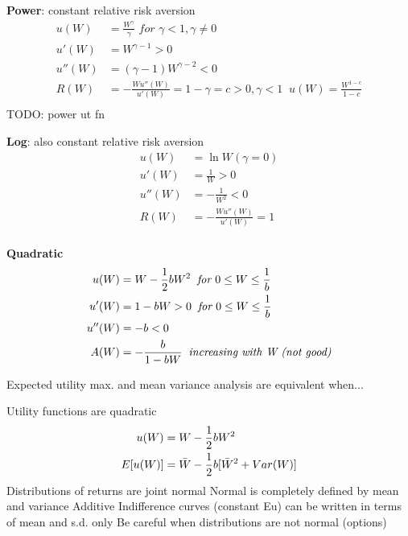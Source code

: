\documentclass[
14pt,notheorems,hyperref={pdfauthor=whatever}
]{beamer}
\begin{document}
\begin{frame}
\textbf{Power}: constant relative risk aversion\\
\begin{align*}
    u(W)&=\frac{W^\gamma}{\gamma} \textit{ for } \gamma<1, \gamma\neq0\\
    u'(W)&=W^{\gamma-1}>0\\
    u''(W)&=(\gamma-1)W^{\gamma-2}<0\\
    R(W)&=-\frac{Wu''(W)}{u'(W)} = 1-\gamma = c > 0, \gamma < 1 \;\; u(W)=\frac{W^{1-c}}{1-c}\\
\end{align*}
TODO: power ut fn
\end{frame}

\begin{frame}
\textbf{Log}: also constant relative risk aversion\\
\begin{align*}
    u(W)&=\ln{W} (\gamma=0)\\
    u'(W)&=\frac{1}{W}>0\\
    u''(W)&=-\frac{1}{W^2}<0\\
    R(W)&=-\frac{Wu''(W)}{u'(W)}=1\\
\end{align*}
\end{frame}

\begin{frame}
\textbf{Quadratic}\\
\begin{align*}
    u(W)&=W-\frac{1}{2}bW^2 \textit{\;\;for } 0\leq W\leq \frac{1}{b}\\
    u'(W)&=1-bW>0 \textit{\;\;for } 0\leq W\leq \frac{1}{b}\\
    u''(W)&=-b<0\\
    A(W)&=-\frac{b}{1-bW} \textit{\;\;increasing with W (not good)}\\
\end{align*}
\end{frame}

\begin{frame}
Expected utility max. and mean variance analysis are equivalent when...\\
\hfill \break
\begin{outline}
    \1 Utility functions are quadratic
    \begin{align*}
        u(W)&=W-\frac{1}{2}bW^2\\
        E[u(W)]&=\Bar{W}-\frac{1}{2}b[\Bar{W}^2+Var(W)]
    \end{align*}
    \1 Distributions of returns are joint normal
        \2 Normal is completely defined by mean and variance
        \2 Additive
        \2 Indifference curves (constant Eu) can be written in terms of mean and s.d. only
    \1 Be careful when distributions are not normal (options)
\end{outline}
\end{frame}
\end{document}
